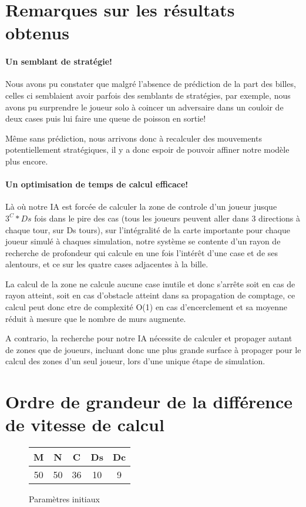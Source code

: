 	\section{Remarques sur les résultats obtenus}
	
		\paragraph{Un semblant de stratégie!}
		Nous avons pu constater que malgré l'absence de prédiction de la part des billes, celles ci semblaient avoir parfois des semblants de stratégies, par exemple, nous avons pu surprendre le joueur solo à coincer un adversaire dans un couloir de deux cases puis lui faire une queue de poisson en sortie!
		
		Même sans prédiction, nous arrivons donc à recalculer des mouvements potentiellement stratégiques, il y a donc espoir de pouvoir affiner notre modèle plus encore.
		
		\paragraph{Un optimisation de temps de calcul efficace!}
		Là où notre IA est forcée de calculer la zone de controle d'un joueur jusque $3^C*Ds$ fois dans le pire des cas (tous les joueurs peuvent aller dans 3 directions à chaque tour, sur Ds tours), sur l'intégralité de la carte importante pour chaque joueur simulé à chaques simulation, notre système se contente d'un rayon de recherche de profondeur qui calcule en une fois l'intérêt d'une case et de ses alentours, et ce sur les quatre cases adjacentes à la bille.
		
		La calcul de la zone ne calcule aucune case inutile et donc s'arrête soit en cas de rayon atteint, soit en cas d'obstacle atteint dans sa propagation de comptage, ce calcul peut donc etre de complexité O(1) en cas d'encerclement et sa moyenne réduit à mesure que le nombre de murs augmente.
		
		A contrario, la recherche pour notre IA nécessite de calculer et propager autant de zones que de joueurs, incluant donc une plus grande surface à propager pour le calcul des zones d'un seul joueur, lors d'une unique étape de simulation.
	
	\section{Ordre de grandeur de la différence de vitesse de calcul}
		\begin{figure}[H]
			\centering
			\begin{tabular}{c c c c c}
				M&N&C&Ds&Dc\\\hline
				50&50&36&10&9\\				
			\end{tabular}
		\caption{Paramètres initiaux}	
		\end{figure}
		
